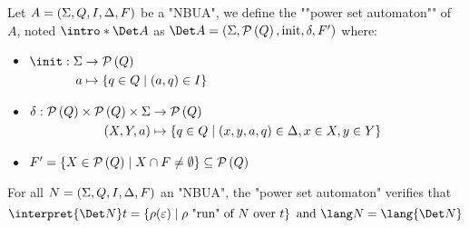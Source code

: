 \documentclass{article}
\begin{document}
\begin{definition}
	Let $A = (\Sigma, Q, I, \Delta, F)$ be a "NBUA", we define the ""power set automaton"" of $A$, noted $\intro* \Det A$ as
	$\Det A = (\Sigma, \parts Q, \text{init}, \delta, F')$ where:

	\begin{itemize}
		\item $\begin{aligned}[t]
				      \init      : \Sigma & \to \parts Q                          \\
				      a                   & \mapsto \setdef{q \in Q}{(a,q) \in I}
			      \end{aligned} $

		\item $\begin{aligned}[t]
				      \delta               : \mathcal{P}\left(Q\right) \times \mathcal{P}\left(Q\right) \times \Sigma & \to \mathcal{P}\left(Q\right)                                                     \\
				      (X, Y, a)                                                     & \mapsto \left\{q \in Q \mid (x,y,a,q) \in \Delta, x \in X, y \in Y\right\}
			      \end{aligned}$

		\item $F' = \left\{X \in \mathcal{P}\left(Q\right) \mid X \cap F \neq \emptyset\right\} \subseteq \mathcal{P}\left(Q\right)$
	\end{itemize}
\end{definition}

\begin{theorem}
	For all $N = (\Sigma, Q, I, \Delta, F)$ an "NBUA", the "power set automaton" verifies that
	\[
		\interpret {\Det N} t = \setdef {\rho(\varepsilon)}{\text{$\rho$ "run" of~$N$ over~$t$}} \text{ and } \lang N = \lang {\Det N}
	\]
\end{theorem}
\end{document}
